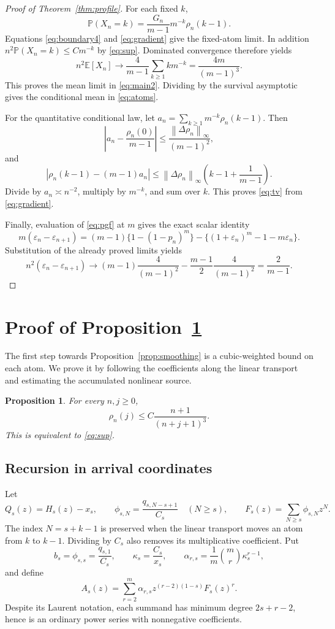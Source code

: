 \documentclass[11pt,letterpaper,reqno]{amsart}
\theoremstyle{plain}
\newtheorem{proposition}[theorem]{Proposition}
\newcommand{\E}{\mathbb E}\newcommand{\Pp}{\mathbb P}
\newcommand{\norm}[1]{\left\lVert#1\right\rVert}
\begin{document}
\begin{proof}[Proof of Theorem~\ref{thm:profile}]
For each fixed $k$,
\[
 \Pp(X_n=k)=\frac{G_n}{m-1}m^{-k}\rho_n(k-1).
\]
Equations \eqref{eq:boundary4} and \eqref{eq:gradient} give the fixed-atom limit. In addition $n^2\Pp(X_n=k)\le Cm^{-k}$ by \eqref{eq:sup}. Dominated convergence therefore yields
\[
 n^2\E[X_n]\longrightarrow\frac4{m-1}\sum_{k\ge1}km^{-k}
 =\frac{4m}{(m-1)^3}.
\]
This proves the mean limit in \eqref{eq:main2}. Dividing by the survival asymptotic gives the conditional mean in \eqref{eq:atoms}.

For the quantitative conditional law, let
$a_n=\sum_{k\ge1}m^{-k}\rho_n(k-1)$. Then
\[
 \left|a_n-\frac{\rho_n(0)}{m-1}\right|\le\frac{\norm{\Delta\rho_n}_\infty}{(m-1)^2},
\]
and
\[
 \left|\rho_n(k-1)-(m-1)a_n\right|
 \le \norm{\Delta\rho_n}_\infty\left(k-1+\frac1{m-1}\right).
\]
Divide by $a_n\asymp n^{-2}$, multiply by $m^{-k}$, and sum over $k$. This proves \eqref{eq:tv} from \eqref{eq:gradient}.

Finally, evaluation of \eqref{eq:pgf} at $m$ gives the exact scalar identity
\[
 m(\varepsilon_n-\varepsilon_{n+1})
 =(m-1)\{1-(1-p_n)^m\}-\{(1+\varepsilon_n)^m-1-m\varepsilon_n\}.
\]
Substitution of the already proved limits yields
\[
 n^2(\varepsilon_n-\varepsilon_{n+1})\longrightarrow
 (m-1)\frac4{(m-1)^2}-\frac{m-1}{2}\frac4{(m-1)^2}
 =\frac2{m-1}.
\]
\end{proof}

\section{Proof of Proposition~\ref{prop:pointwise}}\label{sec:pointwise}
The first step towards Proposition~\ref{prop:smoothing} is a cubic-weighted bound on each atom. We prove it by following the coefficients along the linear transport and estimating the accumulated nonlinear source.

\begin{proposition}\label{prop:pointwise}
For every $n,j\ge0$,
\begin{equation}\label{eq:pointwise}
 \rho_n(j)\le C\frac{n+1}{(n+j+1)^3}.
\end{equation}
This is equivalent to \eqref{eq:sup}.
\end{proposition}


\subsection{Recursion in arrival coordinates}
Let
\[
 Q_s(z)=H_s(z)-x_s,\qquad
 \phi_{s,N}=\frac{q_{s,N-s+1}}{C_s}\quad(N\ge s),\qquad
 F_s(z)=\sum_{N\ge s}\phi_{s,N}z^N.
\]
The index $N=s+k-1$ is preserved when the linear transport moves an atom from $k$ to $k-1$. Dividing by $C_s$ also removes its multiplicative coefficient. Put
\[
 b_s=\phi_{s,s}=\frac{q_{s,1}}{C_s},\qquad
 \kappa_s=\frac{C_s}{x_s},\qquad
 \alpha_{r,s}=\frac1m\binom mr\kappa_s^{r-1},
\]
and define
\begin{equation}\label{eq:arrivalA}
 A_s(z)=\sum_{r=2}^m\alpha_{r,s}z^{(r-2)(1-s)}F_s(z)^r.
\end{equation}
Despite its Laurent notation, each summand has minimum degree $2s+r-2$, hence is an ordinary power series with nonnegative coefficients.
\end{document}
